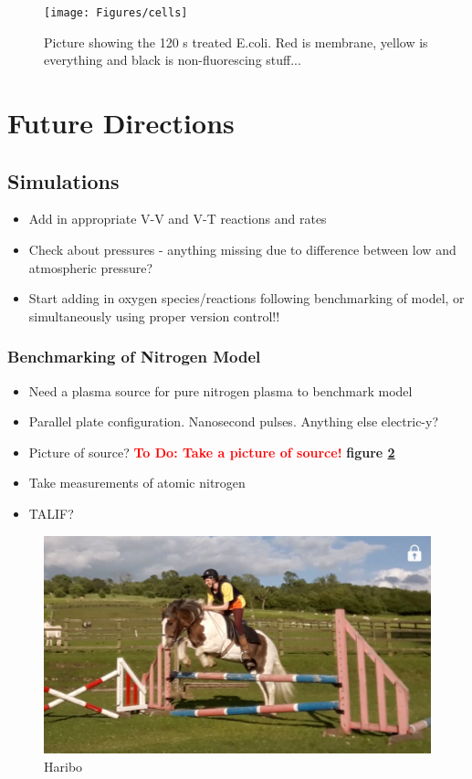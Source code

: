 \documentclass[11pt, oneside]{article}   	%
\newcommand{\todo}[1]{ \textcolor{red}{\bf{To Do:} #1}}
\begin{document}
\begin{figure}
\centering
\texttt{[image: Figures/cells]}
\caption{Picture showing the 120 s treated E.coli. Red is membrane, yellow is everything and black is non-fluorescing stuff...}
\label{fig:results}
\end{figure}


\section{Future Directions}

\subsection{Simulations}

\begin{itemize}
\item Add in appropriate V-V and V-T reactions and rates
\item Check about pressures - anything missing due to difference between low and atmospheric pressure?
\item Start adding in oxygen species/reactions following benchmarking of model, or simultaneously using proper version control!!
\end{itemize}

\subsubsection{Benchmarking of Nitrogen Model}

\begin{itemize}
\item Need a plasma source for pure nitrogen plasma to benchmark model
\item Parallel plate configuration. Nanosecond pulses. Anything else electric-y?
\item Picture of source? \todo{Take a picture of source!} \textbf{figure \ref{fig:plasma_source}}
\item Take measurements of atomic nitrogen
\item TALIF?
\end{itemize}

\begin{figure}
\centering
\includegraphics[width=\textwidth]{Figures/Harry}
\caption{Haribo}
\label{fig:plasma_source}
\end{figure}
\end{document}
